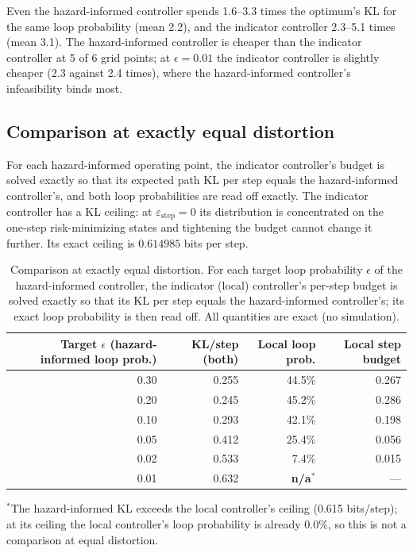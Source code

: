\documentclass[11pt]{article}
\begin{document}
Even the hazard-informed controller spends 1.6--3.3 times the optimum's KL for the same loop probability (mean 2.2), and the indicator controller 2.3--5.1 times (mean 3.1). The hazard-informed controller is cheaper than the indicator controller at 5 of 6 grid points; at $\epsilon{=}0.01$ the indicator controller is slightly cheaper (2.3 against 2.4 times), where the hazard-informed controller's infeasibility binds most.

\subsection{Comparison at exactly equal distortion}
For each hazard-informed operating point, the indicator controller's budget is solved exactly so that its expected path KL per step equals the hazard-informed controller's, and both loop probabilities are read off exactly. The indicator controller has a KL ceiling: at $\varepsilon_{\text{step}}{=}0$ its distribution is concentrated on the one-step risk-minimizing states and tightening the budget cannot change it further. Its exact ceiling is $0.614985$ bits per step.

\begin{table}[ht]
\centering
\caption{Comparison at exactly equal distortion. For each target loop probability $\epsilon$ of the hazard-informed controller, the indicator (local) controller's per-step budget is solved exactly so that its KL per step equals the hazard-informed controller's; its exact loop probability is then read off. All quantities are exact (no simulation).}
\label{tab:synthetic}
\begin{tabular}{@{}rrrr@{}}
\toprule
Target $\epsilon$ (hazard-informed loop prob.) & KL/step (both) & Local loop prob. & Local step budget \\
\midrule
0.30 & 0.255 & 44.5\% & 0.267 \\
0.20 & 0.245 & 45.2\% & 0.286 \\
0.10 & 0.293 & 42.1\% & 0.198 \\
0.05 & 0.412 & 25.4\% & 0.056 \\
0.02 & 0.533 & 7.4\% & 0.015 \\
0.01 & 0.632 & \textbf{n/a}$^{*}$ & --- \\
\bottomrule
\end{tabular}

\vspace{4pt}
{\footnotesize $^{*}$The hazard-informed KL exceeds the local controller's ceiling (0.615 bits/step); at its ceiling the local controller's loop probability is already 0.0\%, so this is not a comparison at equal distortion.}
\end{table}
\end{document}
